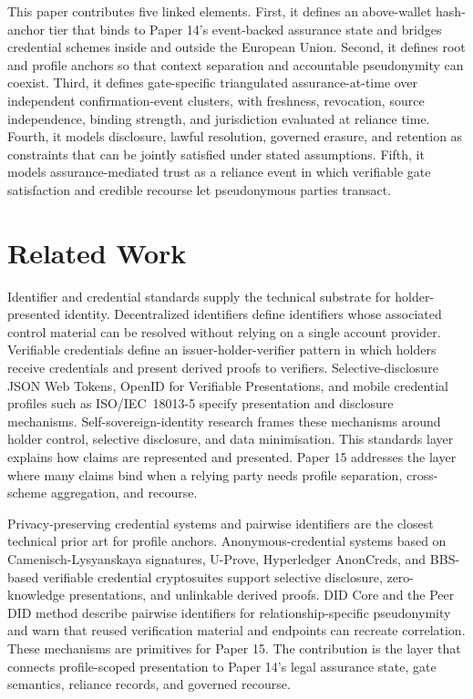 \documentclass[oneside,10pt]{swissi}
\begin{document}
This paper contributes five linked elements. First, it defines an above-wallet hash-anchor tier that binds to Paper 14's event-backed assurance state and bridges credential schemes inside and outside the European Union. Second, it defines root and profile anchors so that context separation and accountable pseudonymity can coexist. Third, it defines gate-specific triangulated assurance-at-time over independent confirmation-event clusters, with freshness, revocation, source independence, binding strength, and jurisdiction evaluated at reliance time. Fourth, it models disclosure, lawful resolution, governed erasure, and retention as constraints that can be jointly satisfied under stated assumptions. Fifth, it models assurance-mediated trust as a reliance event in which verifiable gate satisfaction and credible recourse let pseudonymous parties transact.

\bigskip

\section{Related Work}
\label{sec:related}

Identifier and credential standards supply the technical substrate for holder-presented identity. Decentralized identifiers define identifiers whose associated control material can be resolved without relying on a single account provider.\cite{w3cdid} Verifiable credentials define an issuer-holder-verifier pattern in which holders receive credentials and present derived proofs to verifiers.\cite{w3cvc} Selective-disclosure JSON Web Tokens, OpenID for Verifiable Presentations, and mobile credential profiles such as ISO/IEC~18013-5 specify presentation and disclosure mechanisms.\cite{sdjwt,oid4vp,iso18013} Self-sovereign-identity research frames these mechanisms around holder control, selective disclosure, and data minimisation.\cite{schardong2022ssi} This standards layer explains how claims are represented and presented. Paper 15 addresses the layer where many claims bind when a relying party needs profile separation, cross-scheme aggregation, and recourse.

Privacy-preserving credential systems and pairwise identifiers are the closest technical prior art for profile anchors. Anonymous-credential systems based on Camenisch-Lysyanskaya signatures, U-Prove, Hyperledger AnonCreds, and BBS-based verifiable credential cryptosuites support selective disclosure, zero-knowledge presentations, and unlinkable derived proofs.\cite{camenisch2001anoncreds,uprove2013,w3c2026bbs,anoncreds2026} DID Core and the Peer DID method describe pairwise identifiers for relationship-specific pseudonymity and warn that reused verification material and endpoints can recreate correlation.\cite{w3cdid,peerdid2026} These mechanisms are primitives for Paper 15. The contribution is the layer that connects profile-scoped presentation to Paper 14's legal assurance state, gate semantics, reliance records, and governed recourse.
\end{document}
